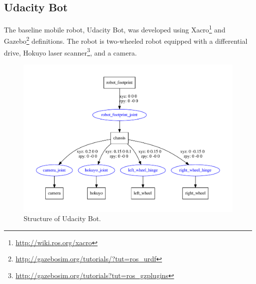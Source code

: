 \documentclass[10pt,journal,compsoc]{IEEEtran}
\begin{document}
\subsection{Udacity Bot}

The baseline mobile robot, Udacity Bot, was developed using Xacro\footnote{\url{http://wiki.ros.org/xacro}} and Gazebo\footnote{\url{http://gazebosim.org/tutorials/?tut=ros_urdf}} definitions. The robot is two-wheeled robot equipped with a differential drive, Hokuyo laser scanner\footnote{\url{http://gazebosim.org/tutorials?tut=ros_gzplugins}}, and a camera.

\begin{figure}[thpb]
      \centering
      \includegraphics[width=\linewidth]{misc/udacity_bot.pdf}
      \caption{Structure of Udacity Bot.}
      \label{fig:udacity_bot}
\end{figure}




\end{document}
